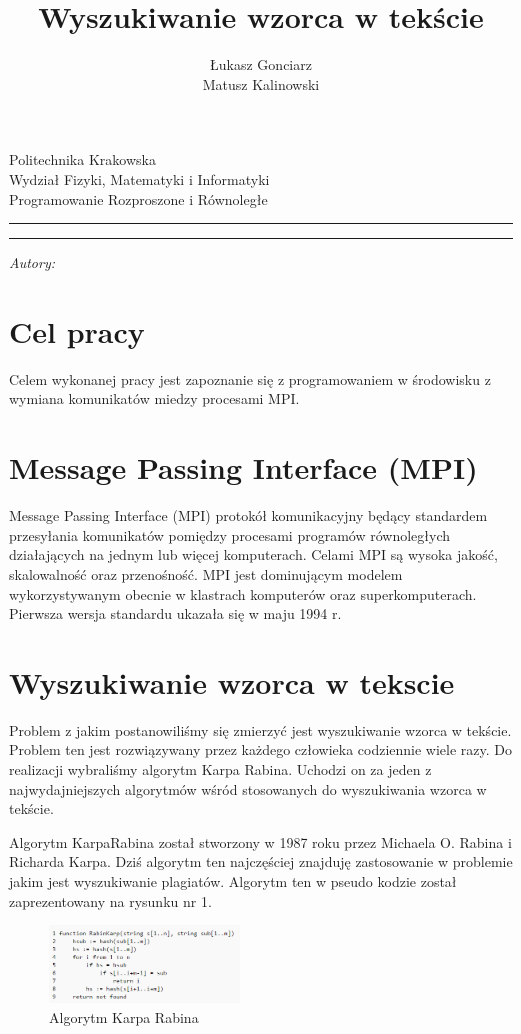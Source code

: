 \documentclass[12pt,a4paper]{article}
\author{Łukasz Gonciarz\\ Matusz Kalinowski}
\title{Wyszukiwanie wzorca w tekście}
\makeatletter
\newcommand{\linia}{\rule{\linewidth}{0.4mm}}
\renewcommand{\maketitle}{\begin{titlepage}
 \vspace*{1cm}
    \begin{center}\small
    Politechnika Krakowska\\
    Wydział Fizyki, Matematyki i Informatyki\\
    Programowanie Rozproszone i Równoległe
    \end{center}
    \vspace{3cm}
    \noindent\linia
    \begin{center}
      \LARGE \textsc{\@title}
         \end{center}
     \linia
    \vspace{0.5cm}
    \begin{flushright}
    \begin{minipage}{5cm}
    \textit{\small Autory:}\\
    \normalsize \textsc{\@author} \par
    \end{minipage}
     \end{flushright}
    \vspace*{\stretch{6}}
    \begin{center}
    \@date
    \end{center}
  \end{titlepage}%
}
\makeatother
\begin{document}
\maketitle
\section*{Cel pracy}
Celem wykonanej pracy jest zapoznanie się z programowaniem w środowisku z wymiana komunikatów miedzy procesami MPI.
\\
\section*{Message Passing Interface (MPI)}
Message Passing Interface (MPI) \- protokół komunikacyjny będący standardem przesyłania komunikatów pomiędzy procesami programów równoległych działających na jednym lub więcej komputerach. Celami MPI są wysoka jakość, skalowalność oraz przenośność. MPI jest dominującym modelem wykorzystywanym obecnie w klastrach komputerów oraz superkomputerach. Pierwsza wersja standardu ukazała się w maju 1994 r.
\\
\section*{Wyszukiwanie wzorca w tekscie}

Problem z jakim postanowiliśmy się zmierzyć jest wyszukiwanie wzorca w tekście. Problem ten jest rozwiązywany przez każdego człowieka codziennie wiele razy. Do realizacji wybraliśmy algorytm Karpa \- Rabina. Uchodzi on za jeden z najwydajniejszych algorytmów wśród stosowanych do wyszukiwania wzorca w tekście.

Algorytm Karpa\-Rabina został stworzony w 1987 roku  przez Michaela O. Rabina i Richarda Karpa. Dziś algorytm ten najczęściej znajduję zastosowanie w problemie jakim jest wyszukiwanie plagiatów.  Algorytm ten w pseudo kodzie został zaprezentowany na rysunku nr 1.

\begin{figure}
  \vspace{-20pt}
  \begin{center}
  \includegraphics[width=0.45\textwidth]{dane/karp_rabin.png}
  \end{center}
  \vspace{-20pt}
  \caption{Algorytm Karpa Rabina}
  \vspace{10pt}
\end{figure}
\end{document}
